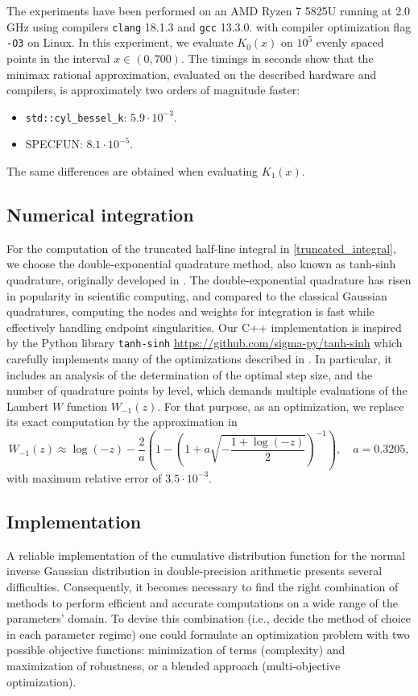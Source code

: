 \documentclass[10pt,a4paper,oneside]{article}
\numberwithin{equation}{section}
\begin{document}
The experiments have been performed on an AMD Ryzen 7 5825U running at 2.0 GHz using compilers \texttt{clang} 18.1.3 and \texttt{gcc} 13.3.0. with compiler optimization flag \texttt{-O3} on Linux. In this experiment, we evaluate $K_0(x)$ on $10^5$ evenly spaced points in the interval $x \in (0, 700)$. The timings in seconds show that the minimax rational approximation, evaluated on the described hardware and compilers, is approximately two orders of magnitude faster:
\begin{itemize}
\item \texttt{std::cyl\_bessel\_k}: $5.9 \cdot 10^{-3}$.
\item SPECFUN: $8.1 \cdot 10^{-5}$.
\end{itemize}
The same differences are obtained when evaluating $K_1(x)$.

\subsection{Numerical integration}\label{algorithmic_numerical_integration}
For the computation of the truncated half-line integral in \eqref{truncated_integral}, we choose the double-exponential quadrature method, also known as tanh-sinh quadrature, originally developed in \cite{Takahasi1973}. The double-exponential quadrature has risen in popularity in scientific computing, and compared to the classical Gaussian quadratures, computing the nodes and weights for integration is fast while effectively handling endpoint singularities. Our C++ implementation is inspired by the Python library \texttt{tanh-sinh} \url{https://github.com/sigma-py/tanh-sinh} which carefully implements many of the optimizations described in \cite{Bailey2006TanhSinhHQ}. In particular, it includes an analysis of the determination of the optimal step size, and the number of quadrature points by level, which demands multiple evaluations of the Lambert $W$ function $W_{-1}(z)$. For that purpose, as an optimization, we replace its exact computation by the approximation in \cite{Barry2004}
\begin{equation}
W_{-1}(z) \approx \log(-z) - \frac{2}{a} \left(1 - \left(1 + a \sqrt{-\frac{1 + \log(-z)}{2}}\right)^{-1}\right), \quad	a = 0.3205,
\end{equation}
with maximum relative error of $3.5\cdot 10^{-3}$.

\subsection{Implementation}\label{subsection_implementation}
A reliable implementation of the cumulative distribution function for the normal inverse Gaussian distribution in double-precision arithmetic presents several difficulties. Consequently, it becomes necessary to find the right combination of methods to perform efficient and accurate computations on a wide range of the parameters' domain. To devise this combination (i.e., decide the method of choice in each parameter regime) one could formulate an optimization problem with two possible objective functions: minimization of terms (complexity) and maximization of robustness, or a blended approach (multi-objective optimization).
\end{document}
